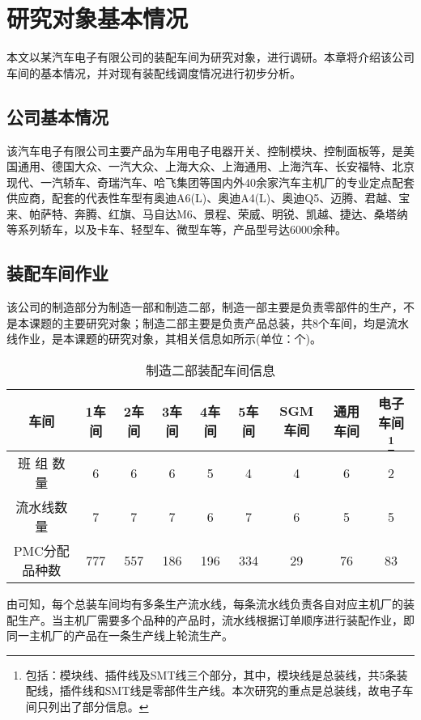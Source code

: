 \chapter{研究对象基本情况}
本文以某汽车电子有限公司的装配车间为研究对象，进行调研。本章将介绍该公司车间的基本情况，并对现有装配线调度情况进行初步分析。
\section{公司基本情况}
该汽车电子有限公司主要产品为车用电子电器开关、控制模块、控制面板等，是美国通用、德国大众、一汽大众、上海大众、上海通用、上海汽车、长安福特、北京现代、一汽轿车、奇瑞汽车、哈飞集团等国内外40余家汽车主机厂的专业定点配套供应商，配套的代表性车型有奥迪A6(L)、奥迪A4(L)、奥迪Q5、迈腾、君越、宝来、帕萨特、奔腾、红旗、马自达M6、景程、荣威、明锐、凯越、捷达、桑塔纳等系列轿车，以及卡车、轻型车、微型车等，产品型号达6000余种。

\section{装配车间作业}
该公司的制造部分为制造一部和制造二部，制造一部主要是负责零部件的生产，不是本课题的主要研究对象；制造二部主要是负责产品总装，共8个车间，均是流水线作业，是本课题的研究对象，其相关信息如所示(单位：个)。
\begin{table}[htbp]
  \centering
  \caption{制造二部装配车间信息}
    \begin{tabular}{cccccccccc}
    \toprule
    \multicolumn{2}{c}{车间 } & 1车间   & 2车间   & 3车间   & 4车间   & 5车间   & SGM车间 & 通用车间  & 电子车间 \footnote{包括：模块线、插件线及SMT线三个部分，其中，模块线是总装线，共5条装配线，插件线和SMT线是零部件生产线。本次研究的重点是总装线，故电子车间只列出了部分信息。} \\
    \midrule
    \multicolumn{2}{c}{班 组 数 量} & 6     & 6     & 6     & 5     & 4     & 4     & 6     & 2 \\
    \multicolumn{2}{c}{流水线数量} & 7     & 7     & 7     & 6     & 7     & 6     & 5     & 5 \\
    \multicolumn{2}{c}{PMC分配品种数} & 777   & 557   & 186   & 196   & 334   & 29    & 76    & 83 \\
    \bottomrule
    \end{tabular}
  \label{tab:2jobshopinfo}
\end{table}

由可知，每个总装车间均有多条生产流水线，每条流水线负责各自对应主机厂的装配生产。当主机厂需要多个品种的产品时，流水线根据订单顺序进行装配作业，即同一主机厂的产品在一条生产线上轮流生产。

